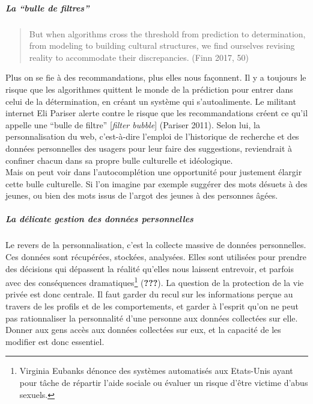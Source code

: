 \documentclass[]{article}
\let\oldsubparagraph\subparagraph
\renewcommand{\subparagraph}[1]{\oldsubparagraph{#1}\mbox{}}
\begin{document}
\hypertarget{la-bulle-de-filtres}{%
\subparagraph{La ``bulle de filtres''}\label{la-bulle-de-filtres}}

\begin{quote}
But when algorithms cross the threshold from prediction to
determination, from modeling to building cultural structures, we find
ourselves revising reality to accommodate their discrepancies. (Finn
2017, 50)
\end{quote}

Plus on se fie à des recommandations, plus elles nous façonnent. Il y a
toujours le risque que les algorithmes quittent le monde de la
prédiction pour entrer dans celui de la détermination, en créant un
système qui s'autoalimente. Le militant internet Eli Pariser alerte
contre le risque que les recommandations créent ce qu'il appelle une
``bulle de filtre'' {[}\emph{filter bubble}{]} (Pariser 2011). Selon
lui, la personnalisation du web, c'est-à-dire l'emploi de l'historique
de recherche et des données personnelles des usagers pour leur faire des
suggestions, reviendrait à confiner chacun dans sa propre bulle
culturelle et idéologique.\\
Mais on peut voir dans l'autocomplétion une opportunité pour justement
élargir cette bulle culturelle. Si l'on imagine par exemple suggérer des
mots désuets à des jeunes, ou bien des mots issus de l'argot des jeunes
à des personnes âgées.

\hypertarget{la-duxe9licate-gestion-des-donnuxe9es-personnelles}{%
\subparagraph{La délicate gestion des données
personnelles}\label{la-duxe9licate-gestion-des-donnuxe9es-personnelles}}

Le revers de la personnalisation, c'est la collecte massive de données
personnelles. Ces données sont récupérées, stockées, analysées. Elles
sont utilisées pour prendre des décisions qui dépassent la réalité
qu'elles nous laissent entrevoir, et parfois avec des conséquences
dramatiques\footnote{Virginia Eubanks dénonce des systèmes automatisés
  aux Etats-Unis ayant pour tâche de répartir l'aide sociale ou évaluer
  un risque d'être victime d'abus sexuels.} ({\textbf{???}}). La
question de la protection de la vie privée est donc centrale. Il faut
garder du recul sur les informations perçue au travers de les profils et
de les comportements, et garder à l'esprit qu'on ne peut pas
rationnaliser la personnalité d'une personne aux données collectées sur
elle. Donner aux gens accès aux données collectées sur eux, et la
capacité de les modifier est donc essentiel.
\end{document}
